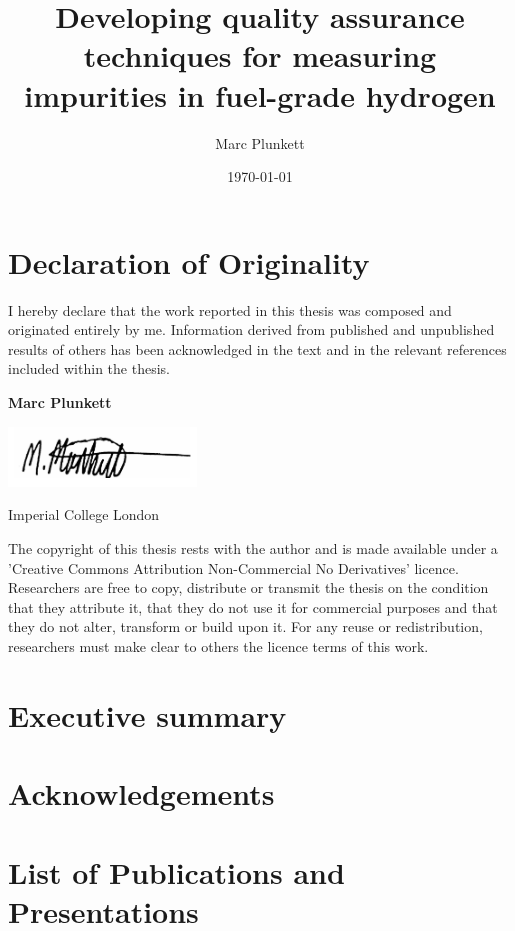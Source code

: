 \documentclass[a4paper,12pt]{report}
\begin{document}
\title{Developing quality assurance techniques for measuring impurities in fuel-grade hydrogen}
\author{Marc Plunkett}
\date{\today}
\maketitle

\chapter*{Declaration of Originality}
I hereby declare that the work reported in this thesis was composed and originated entirely by me. Information derived from published and unpublished results of others has been acknowledged in the text and in the relevant references included within the thesis.

\noindent\newline
\textbf{Marc Plunkett}\newline

\includegraphics[width=50mm,scale=0.5]{figures/sig.png}\newline

\noindent
Imperial College London\newline

The copyright of this thesis rests with the author and is made available under a 'Creative Commons Attribution Non-Commercial No Derivatives' licence. Researchers are free to copy, distribute or transmit the thesis on the condition that they attribute it, that they do not use it for commercial purposes and that they do not alter, transform or build upon it. For any reuse or redistribution, researchers must make clear to others the licence terms of this work.


\chapter*{Executive summary}

\chapter*{Acknowledgements}

\chapter*{List of Publications and Presentations}
\end{document}
